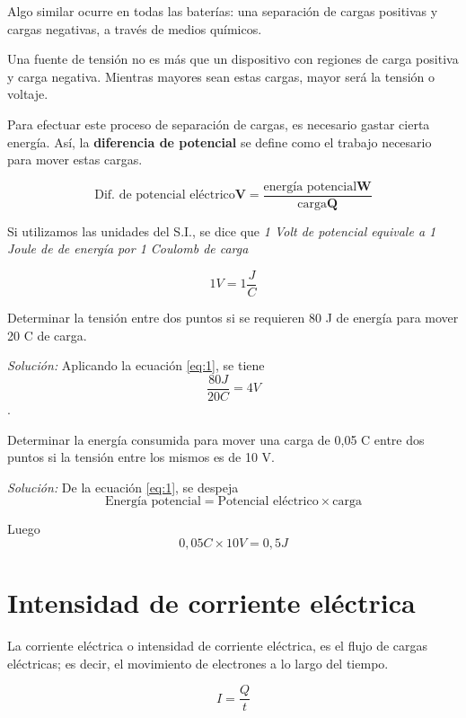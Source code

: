 Algo similar ocurre en todas las baterías: una separación de cargas positivas y cargas negativas, a través de medios químicos.

Una fuente de tensión no es más que un dispositivo con regiones de carga positiva y carga negativa. Mientras mayores sean estas cargas, mayor será la tensión o voltaje.

Para efectuar este proceso de separación de cargas, es necesario gastar cierta energía. Así, la \textbf{diferencia de potencial} se define como el trabajo necesario para mover estas cargas.

\begin{equation} \label{eq:1}
  \text{Dif. de potencial eléctrico} \textbf{V} = \frac{\text{energía potencial}\textbf{W}}{\text{carga}\textbf{Q}}
\end{equation}


Si utilizamos las unidades del S.I., se dice que \textit{1 Volt de potencial equivale a 1 Joule de de energía por 1 Coulomb de carga}

$$ 1 V = 1 \frac{J}{C} $$

\begin{ejemplo}
	Determinar la tensión entre dos puntos si se requieren 80 J de energía para mover 20 C de carga.
	
	\emph{Solución:} Aplicando la ecuación \ref{eq:1}, se tiene $$ \frac{80J}{20C}=4V $$.
\end{ejemplo}

\begin{ejemplo}
	Determinar la energía consumida para mover una carga de 0,05 C entre dos puntos si la tensión entre los mismos es de 10 V.
	
	\emph{Solución:} De la ecuación \ref{eq:1}, se despeja $$ \text{Energía potencial} = \text{Potencial eléctrico} \times \text{carga} $$
	
	Luego $$ 0,05C \times 10V = 0,5 J $$
\end{ejemplo}

\section{Intensidad de corriente eléctrica}

La corriente eléctrica o intensidad de corriente eléctrica, es el flujo de cargas eléctricas; es decir, el movimiento de electrones a lo largo del tiempo.

\begin{equation}
\label{eq:2}
	I=\frac{Q}{t}
\end{equation}

